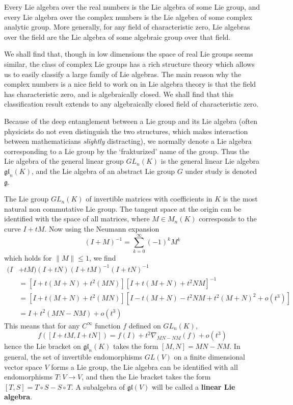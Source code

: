 \begin{fact}[Ado]
    Every Lie algebra over the real numbers is the Lie algebra of some Lie group, and every Lie algebra over the complex numbers is the Lie algebra of some complex analytic group. More generally, for any field of characteristic zero, Lie algebras over the field are the Lie algebra of some algebraic group over that field.
\end{fact}
%
We shall find that, though in low dimensions the space of real Lie groups seems similar, the class of complex Lie groups has a rich structure theory which allows us to easily classify a large family of Lie algebras. The main reason why the complex numbers is a nice field to work on in Lie algebra theory is that the field has characteristic zero, and is algebraically closed. We shall find that this classification result extends to any algebraically closed field of characteristic zero.

Because of the deep entanglement between a Lie group and its Lie algebra (often physicists do not even distinguish the two structures, which makes interaction between mathematicians {\it slightly} distracting), we normally denote a Lie algebra corresponding to a Lie group by the `frakturized' name of the group. Thus the Lie algebra of the general linear group $GL_n(K)$ is the general linear Lie algebra $\mathfrak{gl}_n(K)$, and the Lie algebra of an abstract Lie group $G$ under study is denoted $\mathfrak{g}$.

\begin{example}
    The Lie group $GL_n(K)$ of invertible matrices with coefficients in $K$ is the most natural non commutative Lie group. The tangent space at the origin can be identified with the space of all matrices, where $M \in M_n(K)$ corresponds to the curve $I + tM$. Now using the Neumann expansion
    \[ (I + M)^{-1} = \sum_{k = 0}^\infty (-1)^k M^k \]
    which holds for $\| M \| \leq 1$, we find
    \begin{align*}
        (I& + tM)(I + tN)(I + tM)^{-1}(I + tN)^{-1}\\
        &= [I + t(M + N) + t^2(MN)][I + t(M + N) + t^2NM]^{-1}\\
        &= [I + t(M + N) + t^2(MN)][I - t(M + N) - t^2NM + t^2(M + N)^2 + o(t^3)]\\
        &= I + t^2(MN - NM) + o(t^3)
    \end{align*}
    This means that for any $C^\infty$ function $f$ defined on $GL_n(K)$,
    \[ f([I + tM, I + tN]) = f(I) + t^2 \nabla_{MN - NM}(f) + o(t^3) \]
    hence the Lie bracket on $\mathfrak{gl}_n(K)$ takes the form $[M,N] = MN - NM$. In general, the set of invertible endomorphisms $GL(V)$ on a finite dimensional vector space $V$ forms a Lie group, the Lie algebra can be identified with all endomorphisms $T: V \to V$, and then the Lie bracket takes the form $[T,S] = T \circ S - S \circ T$. A subalgebra of $\mathfrak{gl}(V)$ will be called a {\bf linear Lie algebra}.
\end{example}

